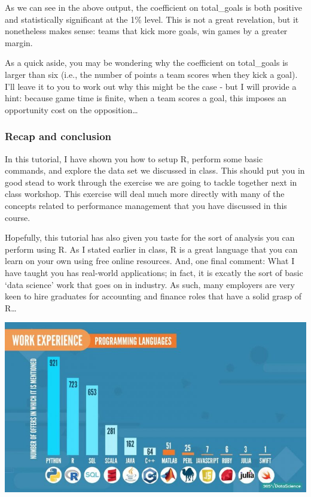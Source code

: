\documentclass[
]{article}
\begin{document}
As we can see in the above output, the coefficient on total\_goals is
both positive and statistically significant at the 1\% level. This is
not a great revelation, but it nonetheless makes sense: teams that kick
more goals, win games by a greater margin.

As a quick aside, you may be wondering why the coefficient on
total\_goals is larger than six (i.e., the number of points a team
scores when they kick a goal). I'll leave it to you to work out why this
might be the case - but I will provide a hint: because game time is
finite, when a team scores a goal, this imposes an opportunity cost on
the opposition\ldots{}

\hypertarget{recap-and-conclusion}{%
\subsubsection{Recap and conclusion}\label{recap-and-conclusion}}

In this tutorial, I have shown you how to setup R, perform some basic
commands, and explore the data set we discussed in class. This should
put you in good stead to work through the exercise we are going to
tackle together next in class workshop. This exercise will deal much
more directly with many of the concepts related to performance
management that you have discussed in this course.

Hopefully, this tutorial has also given you taste for the sort of
analysis you can perform using R. As I stated earlier in class, R is a
great language that you can learn on your own using free online
resources. And, one final comment: What I have taught you has real-world
applications; in fact, it is excatly the sort of basic `data science'
work that goes on in industry. As such, many employers are very keen to
hire graduates for accounting and finance roles that have a solid grasp
of R\ldots{}

\includegraphics{Images/data_science_jobs.jpg}
\end{document}

